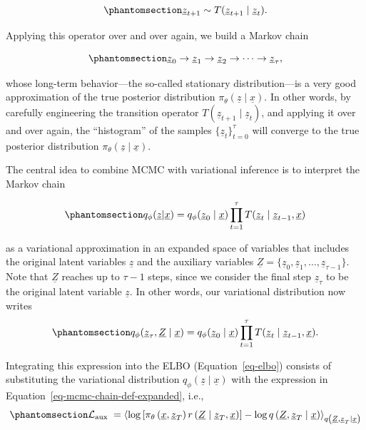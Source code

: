 \documentclass[
]{scrartcl}
\begin{document}
\begin{refsection}
\begin{equation}\phantomsection\label{eq-mcmc-transition}{
\underline{z}_{t + 1} \sim T(\underline{z}_{t+1} \mid \underline{z}_t).
}\end{equation}

Applying this operator over and over again, we build a Markov chain

\begin{equation}\phantomsection\label{eq-mcmc-chain}{
\underline{z}_0 \to \underline{z}_1 \to \underline{z}_2 \to \cdots 
\to \underline{z}_\tau,
}\end{equation}

whose long-term behavior---the so-called stationary distribution---is a
very good approximation of the true posterior distribution
\(π_\theta(\underline{z}
\mid \underline{x})\). In other words, by carefully engineering the
transition operator \(T(\underline{z}_{t+1} \mid \underline{z}_t)\), and
applying it over and over again, the ``histogram'' of the samples
\(\{\underline{z}_t\}_{t=0}^\tau\) will converge to the true posterior
distribution \(π_\theta(\underline{z} \mid
\underline{x})\).

The central idea to combine MCMC with variational inference is to
interpret the Markov chain

\begin{equation}\phantomsection\label{eq-mcmc-chain-def}{
q_\phi(\underline{z} | \underline{x}) = 
q_\phi(\underline{z}_0 \mid \underline{x}) 
\prod_{t=1}^\tau T(\underline{z}_t \mid \underline{z}_{t-1}, \underline{x})
}\end{equation}

as a variational approximation in an expanded space of variables that
includes the original latent variables \(\underline{z}\) and the
auxiliary variables
\(\underline{Z} = \{\underline{z}_0, \underline{z}_1, \ldots,
\underline{z}_{\tau-1}\}\). Note that \(\underline{Z}\) reaches up to
\(\tau-1\) steps, since we consider the final step
\(\underline{z}_\tau\) to be the original latent variable
\(\underline{z}\). In other words, our variational distribution now
writes
\begin{equation}\phantomsection\label{eq-mcmc-chain-def-expanded}{
q_\phi(\underline{z}_\tau, \underline{Z} \mid \underline{x}) = 
q_\phi(\underline{z}_0 \mid \underline{x}) 
\prod_{t=1}^\tau T(\underline{z}_t \mid \underline{z}_{t-1}, \underline{x}).
}\end{equation}

Integrating this expression into the ELBO (Equation~\ref{eq-elbo})
consists of substituting the variational distribution
\(q_\phi(\underline{z} \mid \underline{x})\) with the expression in
Equation~\ref{eq-mcmc-chain-def-expanded}, i.e.,
\begin{equation}\phantomsection\label{eq-elbo-aux}{
\mathcal{L}_{\text {aux }} =
\left\langle\log 
    \left[
        \pi_\theta\left(\underline{x}, \underline{z}_T\right) 
        r\left(\underline{Z} \mid \underline{z}_T, \underline{x}\right)
    \right] - 
    \log q\left(\underline{Z}, \underline{z}_T \mid \underline{x}\right)
\right\rangle_{q\left(\underline{Z}, \underline{z}_T \mid \underline{x}\right)}
}\end{equation}


\end{refsection}
\end{document}
